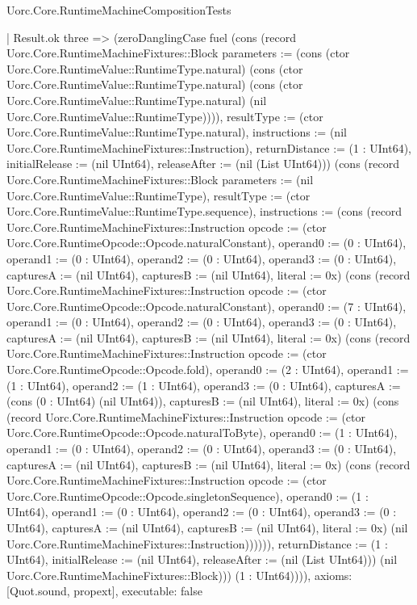 \begin{lexlean}{Uorc.Core.RuntimeMachineCompositionTests}
\begin{semanticmodule}
{      | Result.ok three => (zeroDanglingCase fuel (cons (record Uorc.Core.RuntimeMachineFixtures::Block {parameters := (cons (ctor Uorc.Core.RuntimeValue::RuntimeType.natural) (cons (ctor Uorc.Core.RuntimeValue::RuntimeType.natural) (cons (ctor Uorc.Core.RuntimeValue::RuntimeType.natural) (nil Uorc.Core.RuntimeValue::RuntimeType)))), resultType := (ctor Uorc.Core.RuntimeValue::RuntimeType.natural), instructions := (nil Uorc.Core.RuntimeMachineFixtures::Instruction), returnDistance := (1 : UInt64), initialRelease := (nil UInt64), releaseAfter := (nil (List UInt64))}) (cons (record Uorc.Core.RuntimeMachineFixtures::Block {parameters := (nil Uorc.Core.RuntimeValue::RuntimeType), resultType := (ctor Uorc.Core.RuntimeValue::RuntimeType.sequence), instructions := (cons (record Uorc.Core.RuntimeMachineFixtures::Instruction {opcode := (ctor Uorc.Core.RuntimeOpcode::Opcode.naturalConstant), operand0 := (0 : UInt64), operand1 := (0 : UInt64), operand2 := (0 : UInt64), operand3 := (0 : UInt64), capturesA := (nil UInt64), capturesB := (nil UInt64), literal := 0x}) (cons (record Uorc.Core.RuntimeMachineFixtures::Instruction {opcode := (ctor Uorc.Core.RuntimeOpcode::Opcode.naturalConstant), operand0 := (7 : UInt64), operand1 := (0 : UInt64), operand2 := (0 : UInt64), operand3 := (0 : UInt64), capturesA := (nil UInt64), capturesB := (nil UInt64), literal := 0x}) (cons (record Uorc.Core.RuntimeMachineFixtures::Instruction {opcode := (ctor Uorc.Core.RuntimeOpcode::Opcode.fold), operand0 := (2 : UInt64), operand1 := (1 : UInt64), operand2 := (1 : UInt64), operand3 := (0 : UInt64), capturesA := (cons (0 : UInt64) (nil UInt64)), capturesB := (nil UInt64), literal := 0x}) (cons (record Uorc.Core.RuntimeMachineFixtures::Instruction {opcode := (ctor Uorc.Core.RuntimeOpcode::Opcode.naturalToByte), operand0 := (1 : UInt64), operand1 := (0 : UInt64), operand2 := (0 : UInt64), operand3 := (0 : UInt64), capturesA := (nil UInt64), capturesB := (nil UInt64), literal := 0x}) (cons (record Uorc.Core.RuntimeMachineFixtures::Instruction {opcode := (ctor Uorc.Core.RuntimeOpcode::Opcode.singletonSequence), operand0 := (1 : UInt64), operand1 := (0 : UInt64), operand2 := (0 : UInt64), operand3 := (0 : UInt64), capturesA := (nil UInt64), capturesB := (nil UInt64), literal := 0x}) (nil Uorc.Core.RuntimeMachineFixtures::Instruction)))))), returnDistance := (1 : UInt64), initialRelease := (nil UInt64), releaseAfter := (nil (List UInt64))}) (nil Uorc.Core.RuntimeMachineFixtures::Block))) (1 : UInt64)))),
  axioms: [Quot.sound, propext],
  executable: false
}


\end{semanticmodule}
\end{lexlean}
